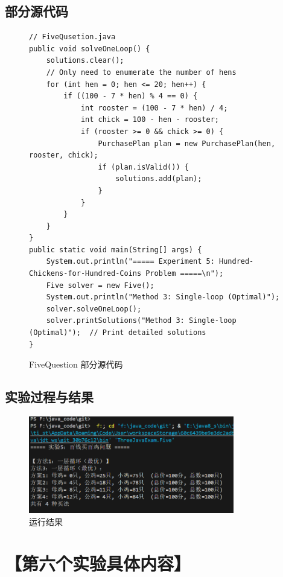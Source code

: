 \documentclass[12pt,a4paper]{article}
\begin{document}
\subsection*{部分源代码}
\begin{figure}[H]
\centering
\begin{lstlisting}
// FiveQusetion.java
public void solveOneLoop() {
    solutions.clear();
    // Only need to enumerate the number of hens
    for (int hen = 0; hen <= 20; hen++) {
        if ((100 - 7 * hen) % 4 == 0) {
            int rooster = (100 - 7 * hen) / 4;
            int chick = 100 - hen - rooster;
            if (rooster >= 0 && chick >= 0) {
                PurchasePlan plan = new PurchasePlan(hen, rooster, chick);
                if (plan.isValid()) {
                    solutions.add(plan);
                }
            }
        }
    }
}
public static void main(String[] args) {
    System.out.println("===== Experiment 5: Hundred-Chickens-for-Hundred-Coins Problem =====\n");
    Five solver = new Five();
    System.out.println("Method 3: Single-loop (Optimal)");
    solver.solveOneLoop();
    solver.printSolutions("Method 3: Single-loop (Optimal)");  // Print detailed solutions
}

\end{lstlisting}

\caption{FiveQuestion 部分源代码}
\end{figure}

\subsection*{实验过程与结果}

\begin{figure}[H]
\centering
\includegraphics[width=0.8\textwidth]{five.png}
\caption{运行结果}
\end{figure}

\section*{【第六个实验具体内容】}
\end{document}
